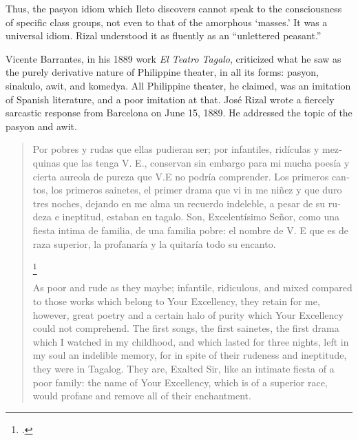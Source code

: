 Thus, the pasyon idiom which Ileto discovers cannot speak to the consciousness of specific class groups, not even to that of the amorphous \enquote*{masses.} It was a universal idiom. Rizal understood it as fluently as an \enquote{unlettered peasant.}

Vicente Barrantes, in his 1889 work \textit{El Teatro Tagalo}, criticized what he saw as the purely derivative nature of Philippine theater, in all its forms: pasyon, sinakulo, awit, and komedya. All Philippine theater, he claimed, was an imitation of Spanish literature, and a poor imitation at that. Jos\'e Rizal wrote a fiercely sarcastic response from Barcelona on June 15, 1889. He addressed the topic of the pasyon and awit.
\begin{quote}
\begin{otherlanguage}{spanish}
Por pobres y rudas que ellas pudieran ser; por infantiles, rid\'iculas y mezquinas que las tenga V. E., conservan sin embargo para mi mucha poes\'ia y cierta aureola de pureza que V.E no podr\'ia comprender. Los primeros cantos, los primeros sainetes, el primer drama que vi in me ni\~nez y que duro tres noches, dejando en me alma un recuerdo indeleble, a pesar de su rudeza e ineptitud, estaban en tagalo. Son, Excelent\'isimo Señor, como una fiesta intima de familia, de una familia pobre: el nombre de V. E que es de raza superior, la profanar\'ia y la quitar\'ia todo su encanto.\end{otherlanguage}\footcite[196; unless otherwise noted, all translations are my own]{Rizal1931}

As poor and rude as they maybe; infantile, ridiculous, and mixed compared to those works which belong to Your Excellency, they retain for me, however, great poetry and a certain halo of purity which Your Excellency could not comprehend. The first songs, the first sainetes, the first drama which I watched in my childhood, and which lasted for three nights, left in my soul an indelible memory, for in spite of their rudeness and ineptitude, they were in Tagalog. They are, Exalted Sir, like an intimate fiesta of a poor family: the name of Your Excellency, which is of a superior race, would profane and remove all of their enchantment.
\end{quote}

